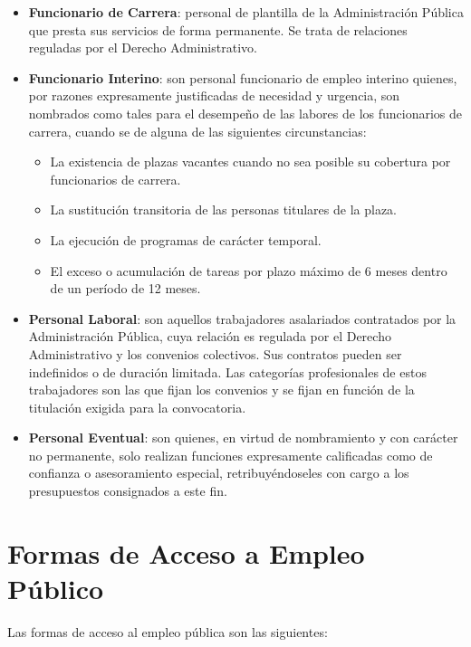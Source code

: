 \begin{itemize}
    \item \textbf{Funcionario de Carrera}: personal de plantilla de la Administración Pública que presta sus servicios de forma permanente. Se trata de relaciones reguladas por el Derecho Administrativo.

    \item \textbf{Funcionario Interino}: son personal funcionario de empleo interino quienes, por razones expresamente justificadas de necesidad y urgencia, son nombrados como tales para el desempeño de las labores de los funcionarios de carrera, cuando se de alguna de las siguientes circunstancias:

    \begin{itemize}
        \item La existencia de plazas vacantes cuando no sea posible su cobertura por funcionarios de carrera.
        \item La sustitución transitoria de las personas titulares de la plaza.
        \item La ejecución de programas de carácter temporal.
        \item El exceso o acumulación de tareas por plazo máximo de 6 meses dentro de un período de 12 meses.
    \end{itemize}

    \item \textbf{Personal Laboral}: son aquellos trabajadores asalariados contratados por la Administración Pública, cuya relación es regulada por el Derecho Administrativo y los convenios colectivos. Sus contratos pueden ser indefinidos o de duración limitada. Las categorías profesionales de estos trabajadores son las que fijan los convenios y se fijan en función de la titulación exigida para la convocatoria.

    \item \textbf{Personal Eventual}: son quienes, en virtud de nombramiento y con carácter no permanente, solo realizan funciones expresamente calificadas como de confianza o asesoramiento especial, retribuyéndoseles con cargo a los presupuestos consignados a este fin.
\end{itemize}

\section{Formas de Acceso a Empleo Público}
Las formas de acceso al empleo pública son las siguientes:

